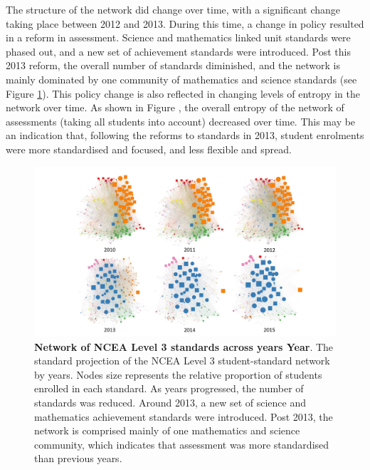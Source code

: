 The structure of the network did change over time, with a significant change taking place between 2012 and 2013. During this time, a change in policy resulted in a reform in assessment. Science and mathematics linked unit standards were phased out, and a new set of achievement standards were introduced. Post this 2013 reform, the overall number of standards diminished, and the network is mainly dominated by one community of mathematics and science standards (see Figure \ref{fig:NetworkYear}). This policy change is also reflected in changing levels of entropy in the network over time. As shown in Figure , the overall entropy of the network of assessments (taking all students into account) decreased over time. This may be an indication that, following the reforms to standards in 2013, student enrolments were more standardised and focused, and less flexible and spread.


\begin{landscape}
\begin{figure}[h]
    \centering
    \includegraphics[width = \textwidth]{C2 - Student Pathways/NCEA_Level3_network_year.pdf}
    \caption{\textbf{Network of NCEA Level 3 standards across years Year}. The standard projection of the NCEA Level 3 student-standard network by years. Nodes size represents the relative proportion of students enrolled in each standard. As years progressed, the number of standards was reduced. Around 2013, a new set of science and mathematics achievement standards were introduced. Post 2013, the network is comprised mainly of one mathematics and science community, which indicates that assessment was more standardised than previous years.
    }
    
    \label{fig:NetworkYear}
\end{figure}
\end{landscape}

